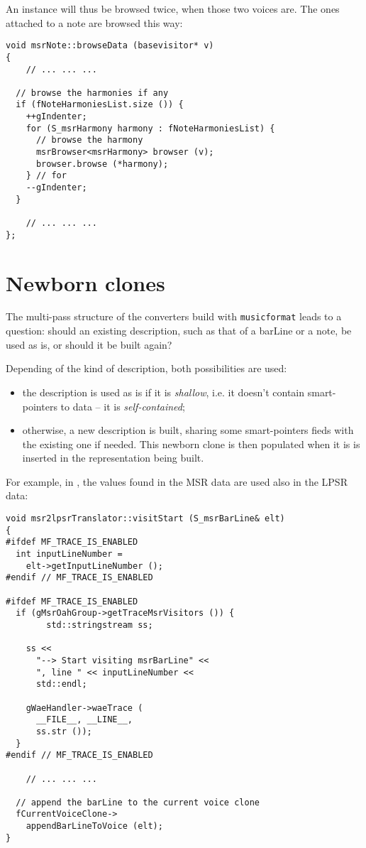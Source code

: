 An  instance will thus be browsed twice, when those two voices are. The ones attached to a note are browsed this way:
\begin{lstlisting}[language=CPlusPlus]
void msrNote::browseData (basevisitor* v)
{
	// ... ... ...

  // browse the harmonies if any
  if (fNoteHarmoniesList.size ()) {
    ++gIndenter;
    for (S_msrHarmony harmony : fNoteHarmoniesList) {
      // browse the harmony
      msrBrowser<msrHarmony> browser (v);
      browser.browse (*harmony);
    } // for
    --gIndenter;
  }

	// ... ... ...
};
\end{lstlisting}


\section{Newborn clones}

The multi-pass structure of the converters build with {\tt musicformat} leads to a question: should an existing description, such as that of a barLine or a note, be used as is, or should it be built again?

Depending of the kind of description, both possibilities are used:
\begin{itemize}
\item the description is used as is if it is {\it shallow}, i.e. it doesn't contain smart-pointers to data -- it is {\it self-contained};
\item otherwise, a new description is built, sharing some smart-pointers fieds with the existing one if needed. This newborn clone is then populated when it is is inserted in the representation being built.
\end{itemize}

For example, in \msrToLpsr{}, the  values found in the MSR data are used also in the LPSR data:
\begin{lstlisting}[language=CPlusPlus]
void msr2lpsrTranslator::visitStart (S_msrBarLine& elt)
{
#ifdef MF_TRACE_IS_ENABLED
  int inputLineNumber =
    elt->getInputLineNumber ();
#endif // MF_TRACE_IS_ENABLED

#ifdef MF_TRACE_IS_ENABLED
  if (gMsrOahGroup->getTraceMsrVisitors ()) {
		std::stringstream ss;

    ss <<
      "--> Start visiting msrBarLine" <<
      ", line " << inputLineNumber <<
      std::endl;

    gWaeHandler->waeTrace (
      __FILE__, __LINE__,
      ss.str ());
  }
#endif // MF_TRACE_IS_ENABLED

	// ... ... ...

  // append the barLine to the current voice clone
  fCurrentVoiceClone->
    appendBarLineToVoice (elt);
}
\end{lstlisting}

